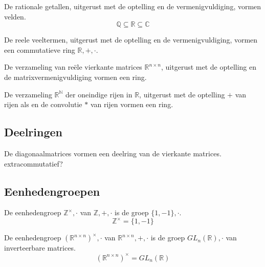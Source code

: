 \documentclass[main.tex]{subfiles}
\begin{document}
\begin{vb}
  De rationale getallen, uitgerust met de optelling en de vermenigvuldiging, vormen velden.
  \[ \mathbb{Q} \subseteq \mathbb{R} \subseteq \mathbb{C} \]
  \commj
\end{vb}

\begin{vb}
  De reele veeltermen, uitgerust met de optelling en de vermenigvuldiging, vormen een commutatieve ring $\mathbb{R},+,\cdot$.\\
  \commj
\end{vb}

\begin{vb}
  De verzameling van re\"ele vierkante matrices $\mathbb{R}^{n\times n}$, uitgerust met de optelling en de matrixvermenigvuldiging vormen een ring. 
\end{vb}

\begin{vb}
  De verzameling $\mathbb{R}^{\mathbb{N}}$ der oneindige rijen in $\mathbb{R}$, uitgerust met de optelling $+$ van rijen als en de convolutie $*$ van rijen vormen een ring.\\
  \commj
\end{vb}

\subsection{Deelringen}
\label{sec:deelringen}

\begin{vb}
  De diagonaalmatrices vormen een deelring van de vierkante matrices.
  extra{commutatief?}
\end{vb}



\subsection{Eenhedengroepen}
\label{sec:eenhedengroepen}

\begin{vb}
  De eenhedengroep $\mathbb{Z}^{\times},\cdot$ van $\mathbb{Z},+,\cdot$ is de groep $\{1,-1\},\cdot$.
  \[ \mathbb{Z}^{\times} = \{1,-1\}\]
\end{vb}

\begin{vb}
  De eenhedengroep $(\mathbb{R}^{n\times n})^{\times},\cdot$ van $\mathbb{R}^{n\times n},+,\cdot$ is de groep $GL_{n}(\mathbb{R}),\cdot$ van inverteerbare matrices.
  \[ (\mathbb{R}^{n\times n})^{\times} = GL_{n}(\mathbb{R}) \]
\end{vb}
\end{document}
